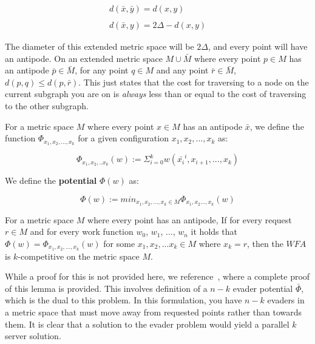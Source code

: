 \begin{equation*}
    \begin{gathered}
        d(\bar{x}, \bar{y}) = d(x,y)\\ \\
        d(\bar{x}, y) = 2\Delta - d(x,y)
    \end{gathered}
\end{equation*}

The diameter of this extended metric space will be $2\Delta$, and every point will have an antipode. On an extended metric space $M \cup \bar{M}$ where every point $p \in M$ has an antipode $\bar{p} \in \bar{M}$, for any point $q \in M$ and any point $\bar{r} \in \bar{M}$, $d(p,q) \leq d(p,\bar{r})$. This just states that the cost for traversing to a node on the current subgraph you are on is \textit{always} less than or equal to the cost of traversing to the other subgraph.

\begin{definition}
    For a metric space $M$ where every point $x \in M$ has an antipode $\bar{x}$, we define the function \textbf{$\Phi_{x_1, x_2, ..., x_k}$} for a given configuration $x_1, x_2, ..., x_k$ as:

    \begin{equation*}
        \Phi_{x_1, x_2, ..x_k}(w) := \Sigma_{i=0}^k w(\bar{x_i}^i, x_{i+1}, ..., x_k)
    \end{equation*}
\end{definition}

\begin{definition}
    We define the \textbf{potential} $\Phi (w)$ as:

    \begin{equation*}
        \Phi(w) := min_{x_1, x_2, ..., x_k \in M} \Phi_{x_1, x_2..., x_k} (w)
    \end{equation*}
\end{definition}

\begin{lemma}
    For a metric space $M$ where every point has an antipode, If for every request $r \in M$ and for every work function $w_0$, $w_1$, ..., $w_n$ it holds that $\Phi(w) = \Phi_{x_1, x_2, ..., x_k}(w)$ for some $x_1, x_2, ...x_k \in M$ where $x_k = r$, then the $WFA$ is $k$-competitive on the metric space $M$.
\end{lemma}

While a proof for this is not provided here, we reference~\cite{unifyingPotential2021}, where a complete proof of this lemma is provided. This involves definition of a $n-k$ evader potential $\bar{\Phi}$, which is the dual to this problem. In this formulation, you have $n-k$ evaders in a metric space that must move away from requested points rather than towards them. It is clear that a solution to the evader problem would yield a parallel $k$ server solution.